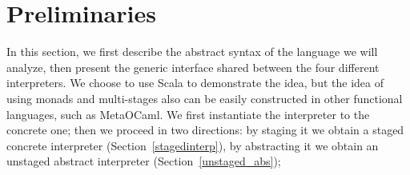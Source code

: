 \newcommand{\TLang}{$L_\lambda$}

\section{Preliminaries}

In this section, we first describe the abstract syntax of the language we will
analyze, then present the generic interface shared between the four different
interpreters. We choose to use Scala to demonstrate the idea, but the idea of
using monads and multi-stages also can be easily constructed in other functional
languages, such as MetaOCaml.
We first instantiate the interpreter to the concrete one; then we
proceed in two directions: by staging it we obtain a staged concrete interpreter
(Section~\ref{stagedinterp}), by abstracting it we obtain an unstaged abstract
interpreter (Section~\ref{unstaged_abs});




